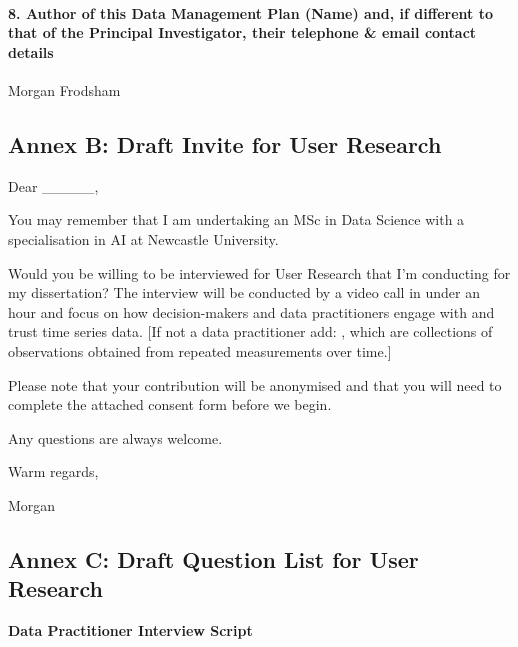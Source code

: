 \documentclass[
]{article}
\begin{document}
\hypertarget{author-of-this-data-management-plan-name-and-if-different-to-that-of-the-principal-investigator-their-telephone-email-contact-details}{%
\paragraph{8. Author of this Data Management Plan (Name) and, if
different to that of the Principal Investigator, their telephone \&
email contact
details}\label{author-of-this-data-management-plan-name-and-if-different-to-that-of-the-principal-investigator-their-telephone-email-contact-details}}

Morgan Frodsham

\newpage

\hypertarget{annex-b-draft-invite-for-user-research}{%
\subsection{Annex B: Draft Invite for User
Research}\label{annex-b-draft-invite-for-user-research}}

Dear \_\_\_\_\_,

You may remember that I am undertaking an MSc in Data Science with a
specialisation in AI at Newcastle University.

Would you be willing to be interviewed for User Research that I'm
conducting for my dissertation? The interview will be conducted by a
video call in under an hour and focus on how decision-makers and data
practitioners engage with and trust time series data. {[}If not a data
practitioner add: , which are collections of observations obtained from
repeated measurements over time.{]}

Please note that your contribution will be anonymised and that you will
need to complete the attached consent form before we begin.

Any questions are always welcome.

Warm regards,

Morgan

\newpage

\hypertarget{annex-c-draft-question-list-for-user-research}{%
\subsection{Annex C: Draft Question List for User
Research}\label{annex-c-draft-question-list-for-user-research}}

\textbf{Data Practitioner Interview Script}
\end{document}
